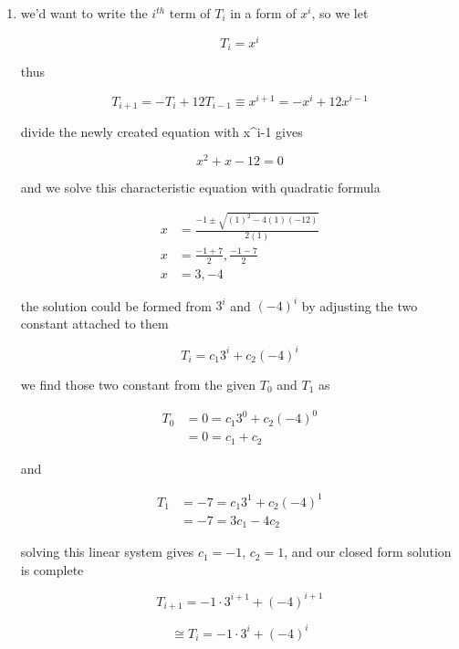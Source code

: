 \begin{enumerate}
        \begin{align*}
        T_1 &= 17 = c_1 2^1 + c_2 3^1 \\
            &= 17 = 2c_1 + 3c_2 \tag{ii}
        \end{align*}

        solving this linear system gives $c_1 = 7 \text{, } c_2 = 1$, and our closed form solution is complete

        \[\boxed{T_{i+1} = 7 \cdot 2^{i+1} + 3^{i+1}}\]

        \[\cong \boxed{T_{i} = 7 \cdot 2^{i} + 3^{i}}\]

    \medskip
    \begin{center}
    \rule{0.3\linewidth}{0.2pt}
    \end{center}
    \medskip    

    \item we'd want to write the $i^{th}$ term of $T_i$ in a form of $x^i$, so we let

        \[T_i = x^i\]

        thus 

        \[T_{i+1} = -T_i + 12T_{i-1} \equiv x^{i+1} = -x^i + 12x^{i-1}\]

        divide the newly created equation with x^{i-1} gives

        \[x^2 + x - 12 = 0\]

        and we solve this characteristic equation with quadratic formula

        \begin{align*}
            x &= \frac{-1 \pm \sqrt{(1)^2 - 4(1)(-12)}}{2(1)} \\
            x &= \frac{-1 + 7}{2}, \frac{-1 - 7}{2} \\
            x &= 3, -4
        \end{align*}

        the solution could be formed from $3^i$ and $(-4)^i$  by adjusting the two constant attached to them

        \[T_i = c_1 3^i + c_2 (-4)^i\]

        we find those two constant from the given $T_0$ and $T_1$ as

        \begin{align*}
        T_0 &= 0 = c_1 3^0 + c_2 (-4)^0 \\
            &= 0 = c_1 + c_2 \tag{i} 
        \end{align*}

        and 

        \begin{align*}
        T_1 &= -7 = c_1 3^1 + c_2 (-4)^1 \\
            &= -7 = 3c_1 - 4c_2 \tag{ii}
        \end{align*}

        solving this linear system gives $c_1 = -1 \text{, } c_2 = 1$, and our closed form solution is complete

        \[\boxed{T_{i+1} = -1 \cdot 3^{i+1} + (-4)^{i+1}}\]

        \[\cong \boxed{T_{i} = -1 \cdot 3^{i} + (-4)^{i}}\]
\end{enumerate}

